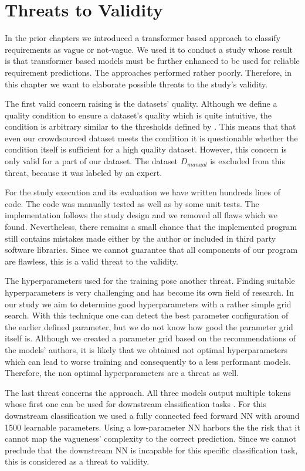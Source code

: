 \chapter{Threats to Validity}
\label{chp:threats_to_validity}
In the prior chapters we introduced a transformer based approach to classify requirements as vague or not-vague.
We used it to conduct a study whose result is that transformer based models must be further enhanced to be used for reliable requirement predictions.
The approaches performed rather poorly.
Therefore, in this chapter we want to elaborate possible threats to the study's validity.

The first valid concern raising is the datasets' quality.
Although we define a quality condition to ensure a dataset's quality which is quite intuitive, the condition is arbitrary similar to the thresholds defined by \textcite{Landis:1977}.
This means that that even our crowdsourced dataset meets the condition it is questionable whether the condition itself is sufficient for a high quality dataset.
However, this concern is only valid for a part of our dataset.
The dataset $D_{manual}$ is excluded from this threat, because it was labeled by an expert.

For the study execution and its evaluation we have written hundreds lines of code.
The code was manually tested as well as by some unit tests.
The implementation follows the study design and we removed all flaws which we found.
Nevertheless, there remains a small chance that the implemented program still contains mistakes made either by the author or included in third party software libraries.
Since we cannot guarantee that all components of our program are flawless, this is a valid threat to the validity.

The hyperparameters used for the training pose another threat.
Finding suitable hyperparameters is very challenging \parencite{Zeiler:2012} and has become its own field of research.
In our study we aim to determine good hyperparameters with a rather simple grid search.
With this technique one can detect the best parameter configuration of the earlier defined parameter, but we do not know how good the parameter grid itself is.
Although we created a parameter grid based on the recommendations of the models' authors, it is likely that we obtained not optimal hyperparameters which can lead to worse training and consequently to a less performant models.
Therefore, the non optimal hyperparameters are a threat as well.

The last threat concerns the approach.
All three models output multiple tokens whose first one can be used for downstream classification tasks \parencite{Devlin:2018}.
For this downstream classification we used a fully connected feed forward \ac{NN} with around 1500 learnable parameters.
Using a low-parameter \ac{NN} harbors the the risk that it cannot map the vagueness' complexity to the correct prediction.
Since we cannot preclude that the downstream \ac{NN} is incapable for this specific classification task, this is considered as a threat to validity.

